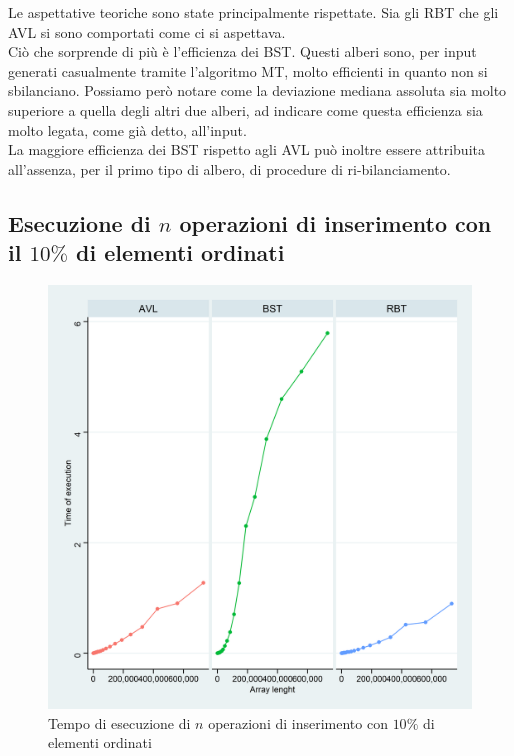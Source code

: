 \documentclass{article}
\begin{document}
	Le aspettative teoriche sono state principalmente rispettate. Sia gli RBT che gli AVL si sono comportati come ci si aspettava.\\
	Ciò che sorprende di più è l'efficienza dei BST. Questi alberi sono, per input generati casualmente tramite l'algoritmo MT, molto efficienti in quanto non si sbilanciano. Possiamo però notare come la deviazione mediana assoluta sia molto superiore a quella degli altri due alberi, ad indicare come questa efficienza sia molto legata, come già detto, all'input. \\
	La maggiore efficienza dei BST rispetto agli AVL può inoltre essere attribuita all'assenza, per il primo tipo di albero, di procedure di ri-bilanciamento.
	
	\newpage
	
	\subsection{Esecuzione di $n$ operazioni di inserimento con il $10\%$ di elementi ordinati}
	\label{subsection:n_op_ins_ord}
		
	\begin{figure}[h!]
		\centering
  		\includegraphics[width=1 \columnwidth]{Grafici/Grafico_All_ordered.png}
  		\caption{Tempo di esecuzione di $n$ operazioni di inserimento con $10\%$ di elementi ordinati}
  		\label{fig:graph2}
	\end{figure}
	
\end{document}
